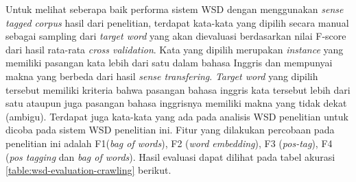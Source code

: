 Untuk melihat seberapa baik performa sistem WSD dengan menggunakan \textit{sense tagged corpus} hasil dari penelitian, terdapat kata-kata yang dipilih secara manual sebagai sampling dari \textit{target word} yang akan dievaluasi berdasarkan nilai F-score dari hasil rata-rata \textit{cross validation}. Kata yang dipilih merupakan \textit{instance} yang memiliki pasangan kata lebih dari satu dalam bahasa Inggris dan mempunyai makna yang berbeda dari hasil \textit{sense transfering}. \textit{Target word} yang dipilih tersebut memiliki kriteria bahwa pasangan bahasa inggris kata tersebut lebih dari satu ataupun juga pasangan bahasa inggrisnya memiliki makna yang tidak dekat (ambigu). Terdapat juga kata-kata yang ada pada analisis WSD penelitian \citep{septiantri2013wsd} untuk dicoba pada sistem WSD penelitian ini. Fitur yang dilakukan percobaan pada penelitian ini adalah F1(\textit{bag of words}), F2 (\textit{word embedding}), F3 (\textit{pos-tag}), F4 (\textit{pos tagging} dan \textit{bag of words}). Hasil evaluasi dapat dilihat pada tabel akurasi  \ref{table:wsd-evaluation-crawling} berikut.
